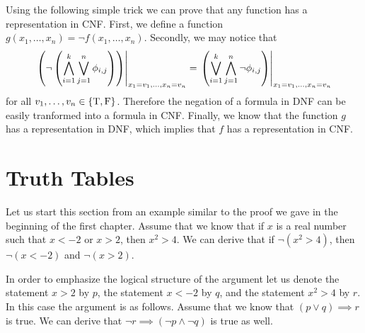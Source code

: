 Using the following simple trick we can prove that any function
has a representation in CNF. First, we define a function
$g(x_1, \dots, x_n) = \lnot f(x_1, \dots, x_n)$. Secondly, we may notice that
\[
  \left. {
    \left(
      \lnot
      \left(
        \bigwedge_{i = 1}^k \bigvee_{j = 1}^n \phi_{i, j}
      \right)
    \right)
  } \right\rvert_{x_1 = v_1, \dots, x_n = v_n}
  =
  \left. {
    \left(
      \bigvee_{i = 1}^k \bigwedge_{j = 1}^n \lnot \phi_{i, j}
    \right)
  } \right\rvert_{x_1 = v_1, \dots, x_n = v_n}
\]
for all $v_1, \dots, v_n \in \set{\ltrue, \lfalse}$. Therefore the negation
of a formula in DNF can be easily tranformed into a formula in CNF.
Finally, we know that the function
$g$ has a representation in DNF, which implies that $f$ has a representation
in CNF.

\section{Truth Tables}
\label{section:truth-tables}

Let us start this section from an example similar to
the proof we gave in the beginning of the first chapter. Assume that we know
that if $x$ is a real number such that $x < -2$ or $x > 2$, then $x^2 > 4$. We
can derive that if $\lnot (x^2 > 4)$, then $\lnot (x < -2)$ and $\lnot (x > 2)$.

In order to emphasize the logical structure of the argument let us denote
the statement $x > 2$ by $p$, the statement $x < -2$ by $q$, and the statement
$x^2 > 4$ by $r$. In this case the argument is as follows.
Assume that we know that $(p \lor q) \implies r$ is true. We
can derive that $\lnot r \implies (\lnot p \land \lnot q)$ is true as well.


